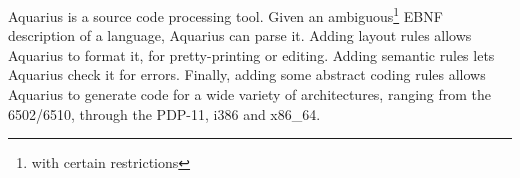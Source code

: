 Aquarius is a source code processing tool.  Given an
ambiguous\footnote{with certain restrictions} EBNF description of a
language, Aquarius can parse it.  Adding layout rules allows Aquarius
to format it, for pretty-printing or editing.  Adding semantic rules
lets Aquarius check it for errors.  Finally, adding some abstract
coding rules allows Aquarius to generate code for a wide variety of
architectures, ranging from the 6502/6510, through the PDP-11, i386
and x86\_64.

